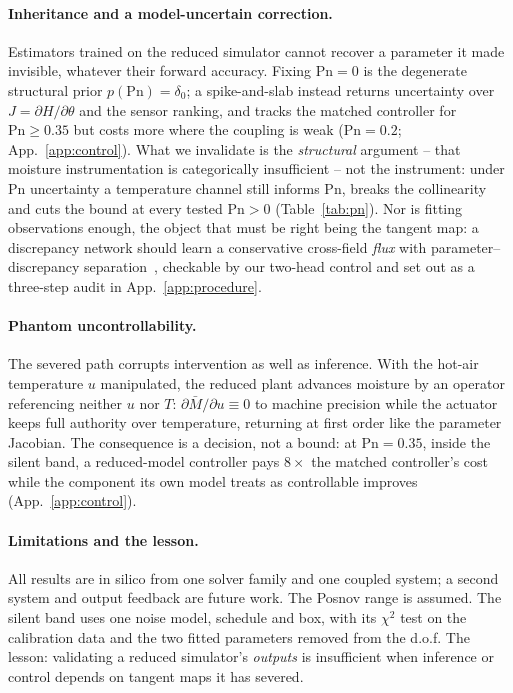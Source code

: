 \documentclass{article}
\begin{document}
\paragraph{Inheritance and a model-uncertain correction.} Estimators trained on the reduced
simulator cannot recover a parameter it made invisible, whatever their forward accuracy. Fixing
$\mathrm{Pn}{=}0$ is the degenerate structural prior $p(\mathrm{Pn}){=}\delta_0$; a spike-and-slab
instead returns uncertainty over $J=\partial H/\partial\theta$ and the sensor ranking, and tracks the
matched controller for $\mathrm{Pn}\!\ge\!0.35$ but costs more where the coupling is weak
($\mathrm{Pn}{=}0.2$; App.~\ref{app:control}). What we invalidate is the \emph{structural} argument -- that moisture
instrumentation is categorically insufficient -- not the instrument: under $\mathrm{Pn}$ uncertainty
a temperature channel still informs $\mathrm{Pn}$, breaks the collinearity and cuts the bound at
every tested $\mathrm{Pn}{>}0$ (Table~\ref{tab:pn}). Nor is fitting observations enough, the object
that must be right being the tangent map: a discrepancy network should learn a conservative
cross-field \emph{flux} with parameter--discrepancy separation~\cite{plumlee2018orthogonal},
checkable by our two-head control and set out as a three-step audit in App.~\ref{app:procedure}.

\paragraph{Phantom uncontrollability.} The severed path corrupts intervention as well as inference.
With the hot-air temperature $u$ manipulated, the reduced plant advances moisture by an operator
referencing neither $u$ nor $T$: $\partial\bar M/\partial u\equiv0$ to machine precision while the
actuator keeps full authority over temperature, returning at first order like the parameter Jacobian.
The consequence is a decision, not a bound: at $\mathrm{Pn}{=}0.35$, inside the silent band, a
reduced-model controller pays $8\times$ the matched controller's cost while the component its own
model treats as controllable improves (App.~\ref{app:control}).

\paragraph{Limitations and the lesson.} All results are in silico from one solver family and one
coupled system; a second system and output feedback are future work. The Posnov range is assumed.
The silent band uses one noise model, schedule and box, with its $\chi^2$ test on the calibration
data and the two fitted parameters removed from the d.o.f. The lesson: validating a reduced
simulator's \emph{outputs} is insufficient when inference or control depends on tangent maps it has
severed.
\end{document}
